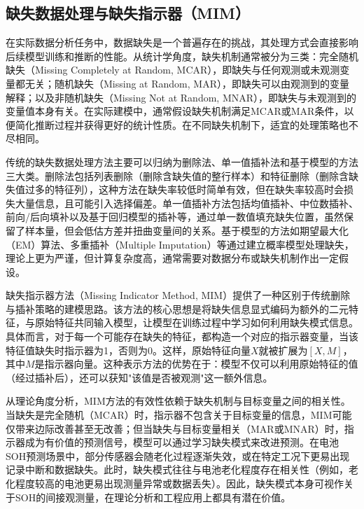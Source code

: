 \documentclass[10pt,a4paper]{ctexart}
\begin{document}
\subsection{缺失数据处理与缺失指示器（MIM）}

在实际数据分析任务中，数据缺失是一个普遍存在的挑战，其处理方式会直接影响后续模型训练和推断的性能。从统计学角度，缺失机制通常被分为三类：完全随机缺失（Missing Completely at Random, MCAR），即缺失与任何观测或未观测变量都无关；随机缺失（Missing at Random, MAR），即缺失可以由观测到的变量解释；以及非随机缺失（Missing Not at Random, MNAR），即缺失与未观测到的变量值本身有关\cite{little2002statistical}。在实际建模中，通常假设缺失机制满足MCAR或MAR条件，以便简化推断过程并获得更好的统计性质\cite{little2002statistical}。在不同缺失机制下，适宜的处理策略也不尽相同。

传统的缺失数据处理方法主要可以归纳为删除法、单一值插补法和基于模型的方法三大类。删除法包括列表删除（删除含缺失值的整行样本）和特征删除（删除含缺失值过多的特征列），这种方法在缺失率较低时简单有效，但在缺失率较高时会损失大量信息，且可能引入选择偏差。单一值插补方法包括均值插补、中位数插补、前向/后向填补以及基于回归模型的插补等，通过单一数值填充缺失位置，虽然保留了样本量，但会低估方差并扭曲变量间的关系。基于模型的方法如期望最大化（EM）算法、多重插补（Multiple Imputation）等通过建立概率模型处理缺失，理论上更为严谨，但计算复杂度高，通常需要对数据分布或缺失机制作出一定假设。

缺失指示器方法（Missing Indicator Method, MIM）提供了一种区别于传统删除与插补策略的建模思路\cite{jones1996indicator,van2023missing}。该方法的核心思想是将缺失信息显式编码为额外的二元特征，与原始特征共同输入模型，让模型在训练过程中学习如何利用缺失模式信息\cite{ipsen2022deal}。具体而言，对于每一个可能存在缺失的特征，都构造一个对应的指示器变量，当该特征值缺失时指示器为1，否则为0。这样，原始特征向量$X$就被扩展为$[X, M]$，其中$M$是指示器向量。这种表示方法的优势在于：模型不仅可以利用原始特征的值（经过插补后），还可以获知"该值是否被观测"这一额外信息。

从理论角度分析，MIM方法的有效性依赖于缺失机制与目标变量之间的相关性。当缺失是完全随机（MCAR）时，指示器不包含关于目标变量的信息，MIM可能仅带来边际改善甚至无改善；但当缺失与目标变量相关（MAR或MNAR）时，指示器成为有价值的预测信号，模型可以通过学习缺失模式来改进预测。在电池SOH预测场景中，部分传感器会随老化过程逐渐失效，或在特定工况下更易出现记录中断和数据缺失。此时，缺失模式往往与电池老化程度存在相关性（例如，老化程度较高的电池更易出现测量异常或数据丢失）。因此，缺失模式本身可视作关于SOH的间接观测量，在理论分析和工程应用上都具有潜在价值。
\end{document}
